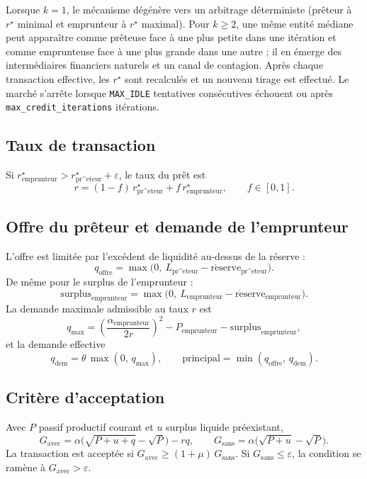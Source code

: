 \documentclass[11pt,a4paper]{article}
\begin{document}
Lorsque \(k=1\), le mécanisme dégénère vers un arbitrage déterministe (prêteur à \(r^\star\) minimal et emprunteur à \(r^\star\) maximal). Pour \(k\ge 2\), une même entité médiane peut apparaître comme prêteuse face à une plus petite dans une itération et comme emprunteuse face à une plus grande dans une autre ; il en émerge des intermédiaires financiers naturels et un canal de contagion. Après chaque transaction effective, les \(r^\star\) sont recalculés et un nouveau tirage est effectué. Le marché s'arrête lorsque \texttt{MAX\_IDLE} tentatives consécutives échouent ou après \texttt{max\_credit\_iterations} itérations.

\subsection{Taux de transaction}

Si \(r^\star_{\mathrm{emprunteur}} > r^\star_{\mathrm{pr\^eteur}} + \varepsilon\), le taux du prêt est
\[
r = (1-f)\,r^\star_{\mathrm{pr\^eteur}} + f\,r^\star_{\mathrm{emprunteur}},
\qquad f\in[0,1].
\]

\subsection{Offre du prêteur et demande de l'emprunteur}

L'offre est limitée par l'excédent de liquidité au-dessus de la réserve :
\[
q_{\mathrm{offre}} = \max\!\bigl(0,\ L_{\mathrm{pr\^eteur}} - \mathrm{r\acute eserve}_{\mathrm{pr\^eteur}}\bigr).
\]
De même pour le surplus de l'emprunteur :
\[
\mathrm{surplus}_{\mathrm{emprunteur}} = \max\!\bigl(0,\ L_{\mathrm{emprunteur}} - \mathrm{r\acute eserve}_{\mathrm{emprunteur}}\bigr).
\]
La demande maximale admissible au taux \(r\) est
\[
q_{\max} = \left(\frac{\alpha_{\mathrm{emprunteur}}}{2r}\right)^2 - P_{\mathrm{emprunteur}} - \mathrm{surplus}_{\mathrm{emprunteur}},
\]
et la demande effective
\[
q_{\mathrm{dem}} = \theta\,\max(0,\,q_{\max}),\qquad
\mathrm{principal} = \min(q_{\mathrm{offre}},\,q_{\mathrm{dem}}).
\]

\subsection{Critère d'acceptation}

Avec \(P\) passif productif courant et \(u\) surplus liquide préexistant,
\[
G_{\mathrm{avec}} = \alpha\bigl(\sqrt{P+u+q}-\sqrt P\bigr)-rq,
\qquad
G_{\mathrm{sans}} = \alpha\bigl(\sqrt{P+u}-\sqrt P\bigr).
\]
La transaction est acceptée si \(G_{\mathrm{avec}} \ge (1+\mu)\,G_{\mathrm{sans}}\). Si \(G_{\mathrm{sans}}\le\varepsilon\), la condition se ramène à \(G_{\mathrm{avec}}>\varepsilon\).
\end{document}
